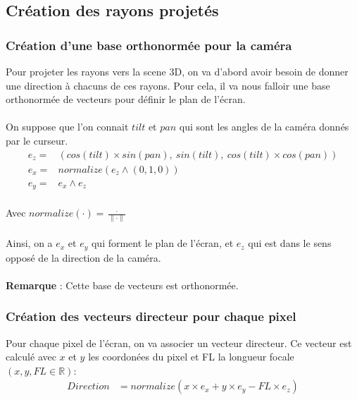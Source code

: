 \newpage
\subsection{Création des rayons projetés}
\subsubsection{Création d'une base orthonormée pour la caméra}
Pour projeter les rayons vers la scene 3D, on va d'abord avoir besoin de donner une direction à chacuns de ces rayons. Pour cela, il va nous falloir une base orthonormée de vecteurs pour définir le plan de l'écran.
\\
\\ 
On suppose que l'on connait $tilt$ et $pan$ qui sont les angles de la caméra donnés par le curseur. 
\begin{align*}
    e_z =&  (cos(tilt)\times sin(pan) ,\ sin(tilt) ,\ cos(tilt)\times cos(pan))\\
    e_x =&  normalize(e_z \wedge (0,1,0) )\\
    e_y =& e_x \wedge e_z\\
\end{align*}

Avec $normalize(\cdot ) = \frac{\cdot }{\| \cdot  \|}$\\ \\  
Ainsi, on a $e_x$ et $e_y$ qui forment le plan de l'écran, et $e_z$ qui est dans le sens opposé de la direction de la caméra.\\ \\ 
\textbf{Remarque} : Cette base de vecteurs est orthonormée.

\subsubsection{Création des vecteurs directeur pour chaque pixel}
Pour chaque pixel de l'écran, on va associer un vecteur directeur. Ce vecteur est calculé avec $x$ et $y$ les coordonées du pixel et FL la longueur focale $(x,y,FL\in \mathbb{R})$: 
\begin{align*}
    Direction &= normalize(x\times e_x + y\times e_y - FL\times e_z)\\
\end{align*}

